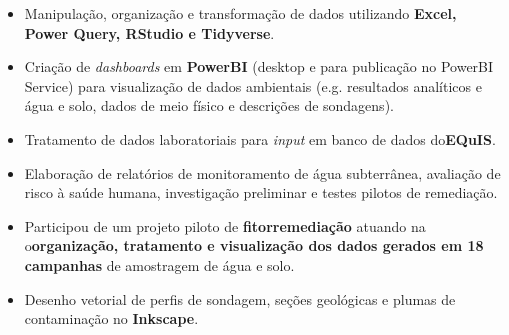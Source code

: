 \documentclass[10pt,a4paper,ragged2e,academicons]{altacv}
\begin{document}
\tagline{}



\begin{fullwidth}
\makecvheader
\end{fullwidth}





\begin{itemize}
    \item Manipulação, organização e transformação de dados utilizando \textbf{Excel, Power Query, RStudio e Tidyverse}.
    \item Criação de \textit{dashboards} em \textbf{PowerBI} (desktop e para publicação no PowerBI Service) para visualização de dados ambientais (e.g. resultados analíticos e água e solo, dados de meio físico e descrições de sondagens).
    \item Tratamento de dados laboratoriais para \textit{input} em banco de dados do\textbf{EQuIS}\faRegistered.
    \item Elaboração de relatórios de monitoramento de água subterrânea, avaliação de risco à saúde humana, investigação preliminar e testes pilotos de remediação.
    \item Participou de um projeto piloto de \textbf{fitorremediação} atuando na o\textbf{organização, tratamento e visualização dos dados gerados em 18 campanhas} de amostragem de água e solo.
    \item Desenho vetorial de perfis de sondagem, seções geológicas e plumas de contaminação no \textbf{Inkscape}.

\end{itemize}
\divider
\end{document}
